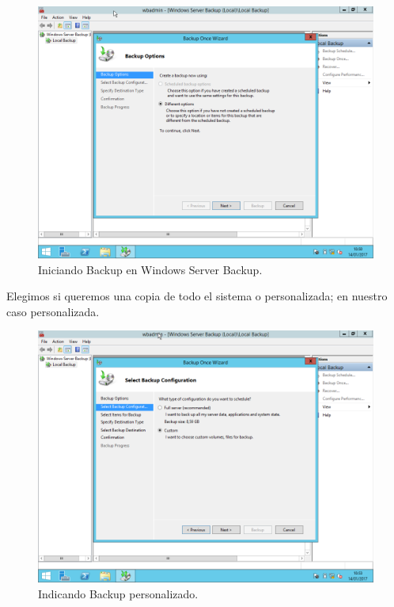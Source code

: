 \begin{figure}[H]
	\begin{center}
		\includegraphics[width=15cm]{Imagenes/Inicio_backup}
		\caption{Iniciando Backup en Windows Server Backup.}
		\label{fig:10}
	\end{center}
\end{figure}
\newpage
Elegimos si queremos una copia de todo el sistema o personalizada; en nuestro caso personalizada.
\begin{figure}[H]
	\begin{center}
		\includegraphics[width=15cm]{Imagenes/Indicando_backup_personalizado}
		\caption{Indicando Backup personalizado.}
		\label{fig:11}
	\end{center}
\end{figure}
